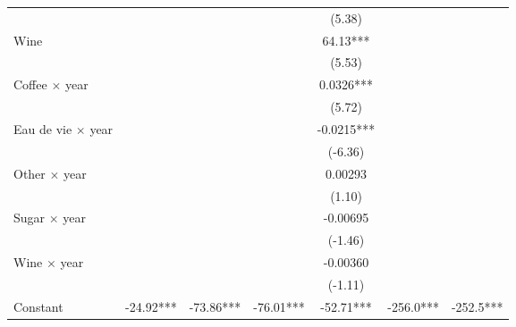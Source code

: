 {\begin{tabular}{l*{6}{c}}
                    &                     &                     &                     &      (5.38)         &                     &                     \\
[1em]
Wine                &                     &                     &                     &       64.13***&                     &                     \\
                    &                     &                     &                     &      (5.53)         &                     &                     \\
[1em]
Coffee $\times$ year&                     &                     &                     &      0.0326***&                     &                     \\
                    &                     &                     &                     &      (5.72)         &                     &                     \\
[1em]
Eau de vie $\times$ year&                     &                     &                     &     -0.0215***&                     &                     \\
                    &                     &                     &                     &     (-6.36)         &                     &                     \\
[1em]
Other $\times$ year &                     &                     &                     &     0.00293         &                     &                     \\
                    &                     &                     &                     &      (1.10)         &                     &                     \\
[1em]
Sugar $\times$ year &                     &                     &                     &    -0.00695         &                     &                     \\
                    &                     &                     &                     &     (-1.46)         &                     &                     \\
[1em]
Wine $\times$ year  &                     &                     &                     &    -0.00360         &                     &                     \\
                    &                     &                     &                     &     (-1.11)         &                     &                     \\
[1em]
Constant            &      -24.92***&      -73.86***&      -76.01***&      -52.71***&      -256.0***&      -252.5***\\

\end{tabular}}
